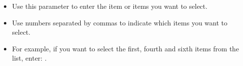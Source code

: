 \begin{itemize}
\item Use this parameter to enter the item or items you want to select.
\item Use numbers separated by commas to indicate which items you want to select.
\item For example, if you want to select the first, fourth and sixth items from the list, enter: .
\end{itemize}

      